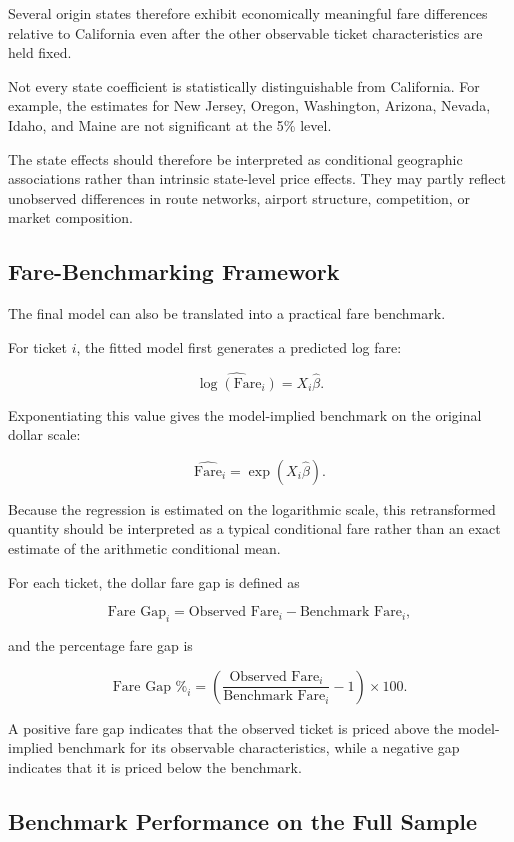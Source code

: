 \documentclass[11pt,a4paper]{article}
\begin{document}
Several origin states therefore exhibit economically meaningful fare differences relative to California even after the other observable ticket characteristics are held fixed.

Not every state coefficient is statistically distinguishable from California. For example, the estimates for New Jersey, Oregon, Washington, Arizona, Nevada, Idaho, and Maine are not significant at the 5\% level.

The state effects should therefore be interpreted as conditional geographic associations rather than intrinsic state-level price effects. They may partly reflect unobserved differences in route networks, airport structure, competition, or market composition.

\subsection{Fare-Benchmarking Framework}

The final model can also be translated into a practical fare benchmark.

For ticket \(i\), the fitted model first generates a predicted log fare:

\[
\widehat{\log(\text{Fare}_i)}
=
X_i\hat{\beta}.
\]

Exponentiating this value gives the model-implied benchmark on the original dollar scale:

\[
\widehat{\text{Fare}}_i
=
\exp\left(X_i\hat{\beta}\right).
\]

Because the regression is estimated on the logarithmic scale, this retransformed quantity should be interpreted as a typical conditional fare rather than an exact estimate of the arithmetic conditional mean.

For each ticket, the dollar fare gap is defined as

\[
\text{Fare Gap}_i
=
\text{Observed Fare}_i
-
\text{Benchmark Fare}_i,
\]

and the percentage fare gap is

\[
\text{Fare Gap \%}_i
=
\left(
\frac{\text{Observed Fare}_i}
{\text{Benchmark Fare}_i}
-1
\right)
\times 100.
\]

A positive fare gap indicates that the observed ticket is priced above the model-implied benchmark for its observable characteristics, while a negative gap indicates that it is priced below the benchmark.

\subsection{Benchmark Performance on the Full Sample}
\end{document}
